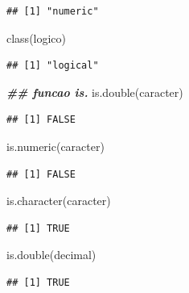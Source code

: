 \documentclass[
]{book}
\newenvironment{Shaded}{\begin{snugshade}}{\end{snugshade}}
\newcommand{\DocumentationTok}[1]{\textcolor[rgb]{0.56,0.35,0.01}{\textbf{\textit{#1}}}}
\newcommand{\FunctionTok}[1]{\textcolor[rgb]{0.00,0.00,0.00}{#1}}
\newcommand{\NormalTok}[1]{#1}
\begin{document}
\begin{verbatim}
## [1] "numeric"
\end{verbatim}

\begin{Shaded}
\begin{Highlighting}[]
\FunctionTok{class}\NormalTok{(logico)}
\end{Highlighting}
\end{Shaded}

\begin{verbatim}
## [1] "logical"
\end{verbatim}

\begin{Shaded}
\begin{Highlighting}[]
\DocumentationTok{\#\# funcao is.}
\FunctionTok{is.double}\NormalTok{(caracter)}
\end{Highlighting}
\end{Shaded}

\begin{verbatim}
## [1] FALSE
\end{verbatim}

\begin{Shaded}
\begin{Highlighting}[]
\FunctionTok{is.numeric}\NormalTok{(caracter)}
\end{Highlighting}
\end{Shaded}

\begin{verbatim}
## [1] FALSE
\end{verbatim}

\begin{Shaded}
\begin{Highlighting}[]
\FunctionTok{is.character}\NormalTok{(caracter)}
\end{Highlighting}
\end{Shaded}

\begin{verbatim}
## [1] TRUE
\end{verbatim}

\begin{Shaded}
\begin{Highlighting}[]
\FunctionTok{is.double}\NormalTok{(decimal)}
\end{Highlighting}
\end{Shaded}

\begin{verbatim}
## [1] TRUE
\end{verbatim}
\end{document}
